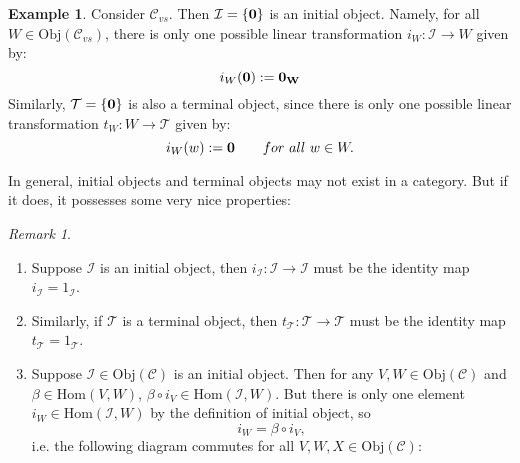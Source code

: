 \documentclass[11pt,openany]{book}
\theoremstyle{plain}
\theoremstyle{definition}
\newtheorem{example}[example]{Example}
\theoremstyle{remark}
\newtheorem{remark}[remark]{Remark}
\begin{document}
\begin{example}
    Consider $\mathcal{C}_{vs}$. Then $\mathcal{I} = \{\bf 0 \}$ is an initial object. Namely, for all $W \in \mathrm{Obj}(\mathcal{C}_{vs})$, 
    there is only one possible linear transformation $i_W: \mathcal{I} \to W$ given by:
    $$i_W(\bf 0) := \bf 0_W$$
    Similarly, $\mathcal{T} = \{\bf 0 \}$ is also a terminal object, since there is only one possible linear transformation $t_W: W \to \mathcal{T}$
    given by:
    $$i_W(w) := {\bf 0} \quad \quad for\ all\ w\in W. $$
\end{example}

In general, initial objects and terminal objects may not exist in a category. But if it does, it possesses some very nice properties: 
\begin{remark}
\begin{enumerate}
    \item Suppose $\mathcal{I}$ is an initial object, then $i_{\mathcal{I}}: \mathcal{I} \to \mathcal{I}$ must be the identity map $i_{\mathcal{I}} = 1_{\mathcal{I}}$. 
    
    \item Similarly, if $\mathcal{T}$ is a terminal object, then $t_{\mathcal{T}}: \mathcal{T} \to \mathcal{T}$ must be the identity map $t_{\mathcal{T}} = 1_{\mathcal{T}}$. 

    \item Suppose $\mathcal{I} \in \mathrm{Obj}(\mathcal{C})$ is an initial object. Then for any $V, W \in \mathrm{Obj}(\mathcal{C})$ and $\beta \in \mathrm{Hom}(V,W)$, $\beta \circ i_V \in \mathrm{Hom}(\mathcal{I},W)$. But there is only one element $i_W \in \mathrm{Hom}(\mathcal{I},W)$ by the definition of initial object, so
    $$i_W = \beta \circ i_V,$$
    i.e. the following diagram commutes for all $V, W, X \in \mathrm{Obj}(\mathcal{C})$:
    \begin{center}
\end{center}


\end{enumerate}
\end{remark}
\end{document}
